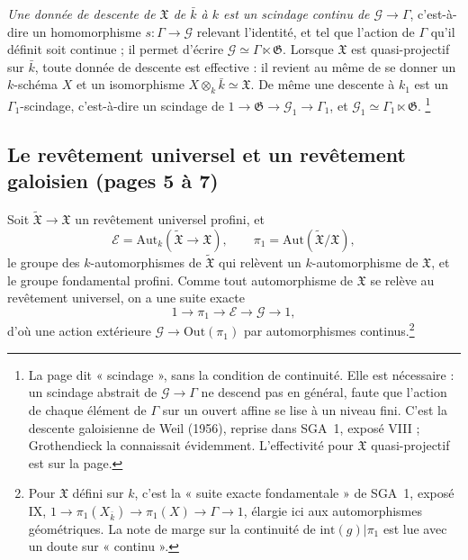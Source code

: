 \documentclass[11pt,a4paper]{article}
\begin{document}
\emph{Une donnée de descente de $\mathfrak{X}$ de $\bar{k}$ à $k$ est un
scindage continu de $\mathcal{G} \to \Gamma$}, c'est-à-dire un homomorphisme
$s : \Gamma \to \mathcal{G}$ relevant l'identité, et tel que l'action de
$\Gamma$ qu'il définit soit continue ; il permet d'écrire $\mathcal{G} \simeq
\Gamma \ltimes \mathfrak{G}$. Lorsque $\mathfrak{X}$ est quasi-projectif sur
$\bar{k}$, toute donnée de descente est effective : il revient au même de se
donner un $k$-schéma $X$ et un isomorphisme $X \otimes_{k} \bar{k} \simeq
\mathfrak{X}$. De même une descente à $k_{1}$ est un $\Gamma_{1}$-scindage,
c'est-à-dire un scindage de $1 \to \mathfrak{G} \to \mathcal{G}_{1} \to
\Gamma_{1}$, et $\mathcal{G}_{1} \simeq \Gamma_{1} \ltimes \mathfrak{G}$.%
\footnote{La page dit « scindage », sans la condition de continuité. Elle est
nécessaire : un scindage abstrait de $\mathcal{G} \to \Gamma$ ne descend pas
en général, faute que l'action de chaque élément de $\Gamma$ sur un ouvert
affine se lise à un niveau fini. C'est la descente galoisienne de Weil (1956),
reprise dans SGA~1, exposé VIII ; Grothendieck la connaissait évidemment.
L'effectivité pour $\mathfrak{X}$ quasi-projectif est sur la page.}

\subsection*{Le revêtement universel et un revêtement galoisien (pages 5 à 7)}

Soit $\widetilde{\mathfrak{X}} \to \mathfrak{X}$ un revêtement universel
profini, et
\[
\mathcal{E} = \mathrm{Aut}_{k}(\widetilde{\mathfrak{X}} \to \mathfrak{X}),
\qquad
\pi_{1} = \mathrm{Aut}(\widetilde{\mathfrak{X}}/\mathfrak{X}),
\]
le groupe des $k$-automorphismes de $\widetilde{\mathfrak{X}}$ qui relèvent un
$k$-automorphisme de $\mathfrak{X}$, et le groupe fondamental profini. Comme
tout automorphisme de $\mathfrak{X}$ se relève au revêtement universel, on a
une suite exacte
\[
1 \to \pi_{1} \to \mathcal{E} \to \mathcal{G} \to 1,
\]
d'où une action extérieure $\mathcal{G} \to \mathrm{Out}(\pi_{1})$ par
automorphismes continus.\footnote{Pour $\mathfrak{X}$ défini sur $k$, c'est la
« suite exacte fondamentale » de SGA~1, exposé IX,
$1 \to \pi_{1}(X_{\bar{k}}) \to \pi_{1}(X) \to \Gamma \to 1$, élargie ici aux
automorphismes géométriques. La note de marge sur la continuité de
$\mathrm{int}(g)|\pi_{1}$ est lue avec un doute sur « continu ».}
\end{document}
